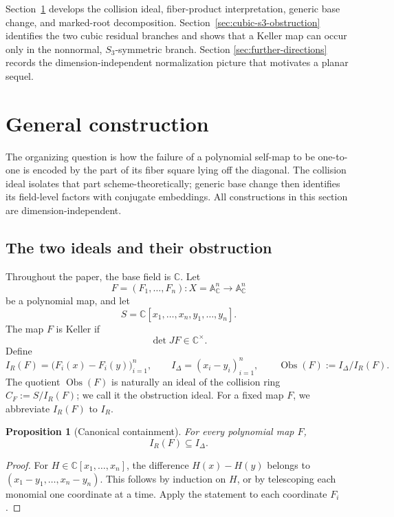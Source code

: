 \documentclass[11pt]{article}
\newtheorem{proposition}[theorem]{Proposition}
\theoremstyle{remark}
\theoremstyle{definition}
\newcommand{\A}{\mathbb A}
\newcommand{\C}{\mathbb C}
\newcommand{\Obs}{\operatorname{Obs}}
\begin{document}
Section~\ref{sec:general-construction} develops the collision ideal,
fiber-product interpretation, generic base change, and marked-root
decomposition.  Section~\ref{sec:cubic-s3-obstruction} identifies the
two cubic residual branches and shows that a Keller map can occur only in
the nonnormal, \(S_3\)-symmetric branch.  Section
\ref{sec:further-directions} records the dimension-independent
normalization picture that motivates a planar sequel.

\section{General construction}
\label{sec:general-construction}

The organizing question is how the failure of a polynomial self-map to be
one-to-one is encoded by the part of its fiber square lying off the diagonal.
The collision ideal isolates that part scheme-theoretically; generic base
change then identifies its field-level factors with conjugate embeddings.
All constructions in this section are dimension-independent.

\subsection{The two ideals and their obstruction}
\label{sec:collision-ideals}

Throughout the paper, the base field is \(\C\).  Let
\[
  F=(F_1,\dots,F_n)\colon
  X=\A^n_{\C}\longrightarrow\A^n_{\C}
\]
be a polynomial map, and let
\[
  S=\C[x_1,\dots,x_n,y_1,\dots,y_n].
\]
The map \(F\) is Keller if
\[
  \det JF\in\C^\times.
\]
Define
\[
  I_R(F)=\bigl(F_i(x)-F_i(y)\bigr)_{i=1}^{n},
  \qquad
  I_\Delta=(x_i-y_i)_{i=1}^{n},
  \qquad
  \Obs(F):=I_\Delta/I_R(F).
\]
The quotient \(\Obs(F)\) is naturally an ideal of the collision ring
\(C_F:=S/I_R(F)\); we call it the obstruction ideal.
For a fixed map \(F\), we abbreviate \(I_R(F)\) to \(I_R\).

\begin{proposition}[Canonical containment]
\label{prop:collision-contained-in-diagonal}
For every polynomial map \(F\),
\[
  I_R(F)\subseteq I_\Delta.
\]
\end{proposition}

\begin{proof}
For \(H\in\C[x_1,\dots,x_n]\), the difference \(H(x)-H(y)\) belongs to
\((x_1-y_1,\dots,x_n-y_n)\).  This follows by induction on \(H\), or by
telescoping each monomial one coordinate at a time.  Apply the statement
to each coordinate \(F_i\).
\end{proof}
\end{document}
